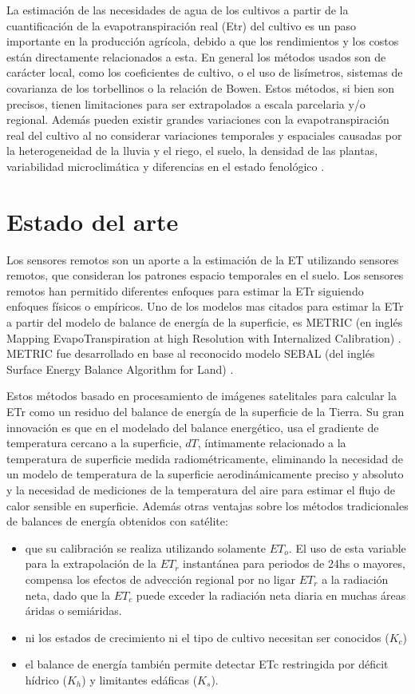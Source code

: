 \documentclass[]{article}
\begin{document}
La estimación de las necesidades de agua de los cultivos a partir de la cuantificación de la evapotranspiración real (Etr) del cultivo es un paso importante en la producción agrícola, debido a que los rendimientos y los costos están directamente relacionados a esta. En general los métodos usados son de carácter local, como los coeficientes de cultivo, o el uso de lisímetros, sistemas de covarianza de los torbellinos o la relación de Bowen. Estos métodos, si bien son precisos, tienen limitaciones para ser extrapolados a escala parcelaria y/o regional. Además pueden existir grandes variaciones con la evapotranspiración real del cultivo al no considerar variaciones temporales y espaciales causadas por la heterogeneidad de la lluvia y el riego, el suelo, la densidad de las plantas, variabilidad microclimática y diferencias en el estado fenológico \citep{Allen2011}. 

\section{Estado del arte}

Los sensores remotos son un aporte a la estimación de la ET utilizando sensores remotos, que consideran los patrones espacio temporales en el suelo. Los sensores remotos han permitido diferentes enfoques para estimar la ETr siguiendo enfoques físicos o empíricos. Uno de los modelos mas citados para estimar la ETr a partir del modelo de balance de energía de la superficie, es METRIC (en inglés Mapping EvapoTranspiration at high Resolution with Internalized Calibration) \citep{Allen2007a}. METRIC fue desarrollado en base al reconocido modelo SEBAL (del inglés Surface Energy Balance Algorithm for Land) \citep{Bastiaanssen1998a, Bastiaanssen1998b}. 

Estos métodos basado en procesamiento de imágenes satelitales para calcular la ETr como un residuo del balance de energía de la superficie de la Tierra. Su gran innovación es que en el modelado del balance energético, usa el gradiente de temperatura cercano a la superficie, $dT$, íntimamente relacionado a la temperatura de superficie medida radiométricamente, eliminando la necesidad de un modelo de temperatura de la superficie aerodinámicamente preciso y absoluto y la necesidad de mediciones de la temperatura del aire para estimar el flujo de calor sensible en superficie. Además otras ventajas sobre los métodos tradicionales de balances de energía obtenidos con satélite: 

\begin{itemize}
	\item que su calibración se realiza utilizando solamente $ET_o$. El uso de esta variable para la extrapolación de la $ET_r$ instantánea para periodos de 24hs o mayores, compensa los efectos de advección regional por no ligar $ET_r$ a la radiación neta, dado que la $ET_c$ puede exceder la radiación neta diaria en muchas áreas áridas o semiáridas.
	\item ni los estados de crecimiento ni el tipo de cultivo necesitan ser conocidos ($K_c$)
	\item el balance de energía también permite detectar ETc restringida por déficit hídrico ($K_h$) y limitantes edáficas ($K_s$).
\end{itemize}
\end{document}

